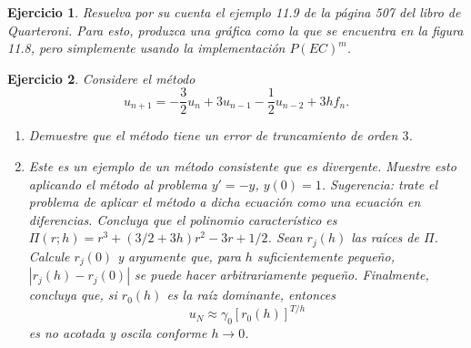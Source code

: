 \documentclass[11pt]{article}
\newtheorem{exercise}{Ejercicio}
\begin{document}
\begin{exercise}
  Resuelva por su cuenta el ejemplo 11.9 de la página 507 del libro de
  Quarteroni. Para esto, produzca una gráfica como la que se encuentra
  en la figura 11.8, pero simplemente usando la implementación
  $P(EC)^{m}$.
\end{exercise}

\begin{exercise}
  Considere el método
  \begin{equation}
    u_{n+1}
    = -\frac{3}{2}u_n + 3u_{n-1} - \frac{1}{2}u_{n-2} + 3hf_n
  .\end{equation}

  \begin{enumerate}
    \item
      Demuestre que el método tiene un error de truncamiento de orden
      $3$.
    \item
      Este es un ejemplo de un método consistente que es divergente.
      Muestre esto aplicando el método al problema $y'=-y$, $y(0)=1$.
      \emph{Sugerencia:} trate el problema de aplicar el método a
      dicha ecuación como una ecuación en diferencias. Concluya que el
      polinomio característico es $\Pi(r;h)=r^{3}+(3/2+3h)r^{2}-3r+1 /
      2$. Sean $r_j(h)$ las raíces de $\Pi$. Calcule $r_j(0)$ y
      argumente que, para $h$ suficientemente pequeño,
      $|r_j(h)-r_j(0)|$ se puede hacer arbitrariamente pequeño.
      Finalmente, concluya que, si $r_0(h)$ es la raíz dominante,
      entonces
      \begin{equation}
        u_N \approx \gamma_0[r_0(h)]^{T/h}
      \end{equation}
      es no acotada y oscila conforme $h\to 0$.
  \end{enumerate}
\end{exercise}
\end{document}

